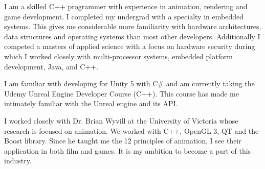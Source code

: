 I am a skilled C++ programmer with experience in animation, rendering and game development.
I completed my undergrad with a specialty in embedded systems. 
This gives me considerable more familiarity with hardware architectures, data structures and operating systems than most other developers.
Additionally I competed a masters of applied science with a focus on hardware security during which I worked closely with multi-processor systems, embedded platform development, Java, and C++. 

I am familiar with developing for Unity 5 with C\# and am currently taking the Udemy Unreal Engine Developer Course (C++).
This course has made me intimately familiar with the Unreal engine and its API.



I worked closely with Dr. Brian Wyvill at the University of Victoria whose research is focused on animation.
We worked with C++, OpenGL 3, QT and the Boost library.
Since he taught me the 12 principles of animation, I see their application in both film and games.
It is my ambition to become a part of this industry. 

